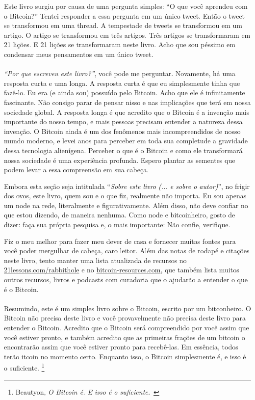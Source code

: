 Este livro surgiu por causa de uma pergunta simples: {\enquote{O que você aprendeu com o Bitcoin?}} Tentei responder a essa pergunta em um único tweet. Então o tweet se transformou em uma thread. A tempestade de tweets se transformou em um artigo. O artigo se transformou em três artigos. Três artigos se transformaram em 21 lições. E 21 lições se transformaram neste livro. Acho que sou péssimo em condensar meus pensamentos em um único tweet.

\paragraph{}
\textit{\enquote{Por que escreveu este livro?}}, você pode me perguntar. Novamente, há uma resposta curta e uma longa. A resposta curta é que eu simplesmente tinha que fazê-lo. Eu era (e ainda sou) {possuído} pelo Bitcoin. Acho que ele é infinitamente fascinante. Não consigo parar de pensar nisso e nas implicações que terá em nossa sociedade global. A resposta longa é que acredito que o Bitcoin é a invenção mais importante do nosso tempo, e mais pessoas precisam entender a natureza dessa invenção. O Bitcoin ainda é um dos fenômenos mais incompreendidos de nosso mundo moderno, e levei anos para perceber em toda sua completude a gravidade dessa tecnologia alienígena. Perceber o que é o Bitcoin e como ele transformará nossa sociedade é uma experiência profunda. Espero plantar as sementes que podem levar a essa compreensão em sua cabeça.

Embora esta seção seja intitulada \enquote{\textit{Sobre este livro (... e sobre o autor)}}, no frigir dos ovos, este livro, quem sou e o que fiz, realmente não importa. Eu sou apenas um node na rede, literalmente {e} figurativamente. Além disso, não deve confiar no que estou dizendo, de maneira nenhuma. Como node e bitcoinheiro, gosto de dizer: faça sua própria pesquisa e, o mais importante: Não confie, verifique.

Fiz o meu melhor para fazer meu dever de casa e fornecer muitas fontes para você poder mergulhar de cabeça, caro leitor. Além das notas de rodapé e citações neste livro, tento manter uma lista atualizada de recursos no \href{https://21lessons.com/rabbithole}{21lessons.com/rabbithole} e no \href{https://bitcoin-resources.com}{bitcoin-resources.com}, que também lista muitos outros recursos, livros e podcasts com curadoria que o ajudarão a entender o que é o Bitcoin.

\paragraph{}
Resumindo, este é um simples livro sobre o Bitcoin, escrito por um bitconheiro. O Bitcoin não precisa deste livro e você provavelmente não precisa deste livro para entender o Bitcoin. Acredito que o Bitcoin será compreendido por você assim que {você} estiver pronto, e também acredito que as primeiras frações de um bitcoin o encontrarão assim que você estiver pronto para recebê-las. Em essência, todos terão \bitcoinB{}itcoin no momento certo. Enquanto isso, o Bitcoin simplesmente é, e isso é o suficiente. \footnote{Beautyon, \textit{O Bitcoin é. E isso é o suficiente.}~\cite{bitcoin-is}}